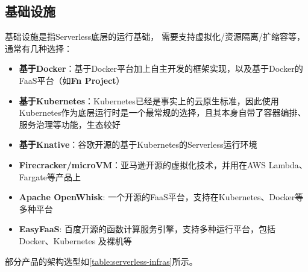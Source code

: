\subsection{基础设施}
基础设施是指Serverless底层的运行基础，
需要支持虚拟化/资源隔离/扩缩容等，
通常有几种选择：

\begin{itemize}
    \item \textbf{基于Docker}：基于Docker平台加上自主开发的框架实现，以及基于Docker的FaaS平台（如\textbf{Fn Project}）
    \item \textbf{基于Kubernetes}：Kubernetes已经是事实上的云原生标准，因此使用Kubernetes作为底层运行时是一个最常规的选择，且其本身自带了容器编排、服务治理等功能，生态较好
    \item \textbf{基于Knative}：谷歌开源的基于Kubernetes的Serverless运行环境
    \item \textbf{Firecracker/microVM}：亚马逊开源的虚拟化技术，并用在AWS Lambda、Fargate等产品上
    \item \textbf{Apache OpenWhisk}: 一个开源的FaaS平台，支持在Kubernetes、Docker等多种平台
    \item \textbf{EasyFaaS}: 百度开源的函数计算服务引擎，支持多种运行平台，包括 Docker、Kubernetes 及裸机等
\end{itemize}

部分产品的架构选型如\cref{table:serverless-infras}所示。


